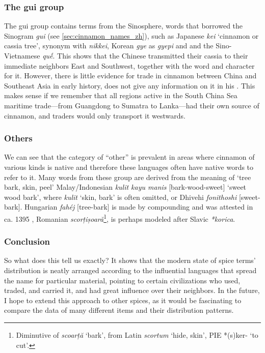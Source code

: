 \subsubsection{The gui group}

The gui group contains terms from the Sinosphere, words that borrowed the Sinogram  \textit{gui} (see \cref{sec:cinnamon_names_zh}), such as Japanese  \textit{kei} `cinnamon or cassia tree', synonym with  \textit{nikkei}, Korean  \textit{gye} as  \textit{gyepi} and  and the Sino-Vietnamese \textit{quế}. This shows that the Chinese transmitted their cassia to their immediate neighbors East and Southwest, together with the word and character for it. However, there is little evidence for trade in cinnamon between China and Southeast Asia in early history, \textcite{wang_nanhai_1958} does not give any information on it in his . \autocite{wang_nanhai_1958} This makes sense if we remember that all regions active in the South China Sea maritime trade---from Guangdong to Sumatra to Lanka---had their own source of cinnamon, and traders would only transport it westwards.

\subsubsection{Others}

We can see that the category of ``other'' is prevalent in areas where cinnamon of various kinds is native and therefore these languages often have native words to refer to it. Many words from these group are derived from the meaning of `tree bark, skin, peel' Malay/Indonesian \textit{kulit kayu manis} [bark-wood-sweet] `sweet wood bark', where \textit{kulit} `skin, bark' is often omitted, or Dhivehi \textit{fonithoshi} [sweet-bark]. Hungarian \textit{fahéj} [tree-bark] is made by compounding and was attested in ca. 1395 \autocite[fahéj]{zaicz_etimologiai_2006}, Romanian \textit{scorțișoară}\footnote{Diminutive of \textit{scoarță} `bark', from Latin \textit{scortum} `hide, skin', \gls{PIE} *(s)ker- `to cut'.}, is perhaps modeled after Slavic \textit{*korica}.

\subsubsection{Conclusion}

So what does this tell us exactly? It shows that the modern state of spice terms' distribution is neatly arranged according to the influential languages that spread the name for particular material, pointing to certain civilizations who used, traded, and carried it, and had great influence over their neighbors. In the future, I hope to extend this approach to other spices, as it would be fascinating to compare the data of many different items and their distribution patterns.

















